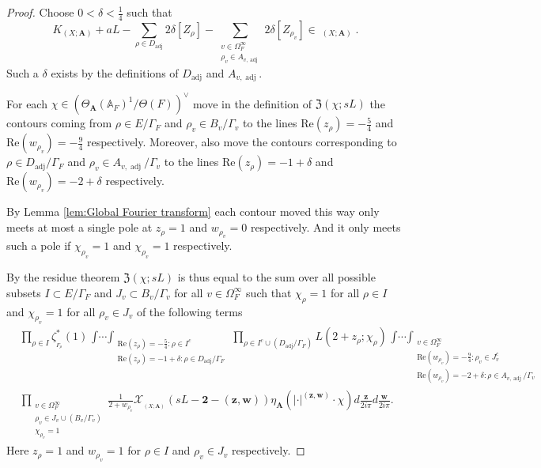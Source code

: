 \documentclass[a4paper,11pt,reqno]{amsart}
\newcommand{\A}{\mathbb{A}}
\DeclareMathOperator{\Eff}{\overline{Eff}}
\DeclareMathOperator{\adj}{adj}
\renewcommand{\Re}{\mathrm{Re}}
\theoremstyle{definition}
\begin{document}
\begin{proof}
	Choose $0 < \delta < \frac{1}{4}$ such that 
	\begin{equation}
		K_{(X; \mathbf{A})} + aL - \sum_{\rho \in D_{\adj}} 2\delta [Z_{\rho}] - \sum_{\substack{v \in \Omega_{F}^{\infty} \\ \rho_v \in A_{v, \adj}}} 2\delta [Z_{\rho_v}] \in \Eff_{(X; \mathbf{A})}. 
		\label{Choice of delta}
	\end{equation}
	Such a $\delta$ exists by the definitions of $D_{\adj}$ and $A_{v, \adj}$.
	
	For each $\chi \in (\Theta_{\mathbf{A}}(\A_F)^1/\Theta(F))^{\vee}$ move in the definition of $\mathfrak{Z}(\chi; sL)$ the contours coming from $\rho \in E / \Gamma_F$ and $\rho_v \in B_v / \Gamma_v$ to the lines $\Re(z_{\rho}) = -\frac{5}{4}$ and $\Re(w_{\rho_v}) = - \frac{9}{4}$ respectively. Moreover, also move the contours corresponding to $\rho \in D_{\adj} / \Gamma_F$ and $\rho_v \in A_{v, \adj} / \Gamma_v$ to the lines $\Re(z_{\rho}) = -1 + \delta$ and $\Re(w_{\rho_v}) = - 2 + \delta$ respectively.
	
	By Lemma \ref{lem:Global Fourier transform} each contour moved this way only meets at most a single pole at $z_{\rho} = 1$ and $w_{\rho_v} = 0$ respectively. And it only meets such a pole if $\chi_{\rho_v} = 1$ and $\chi_{\rho_v} = 1$ respectively.
	
	By the residue theorem $\mathfrak{Z}(\chi ; s L)$ is thus equal to the sum over all possible subsets $I \subset E/\Gamma_F$ and $J_v \subset B_v / \Gamma_v$ for all $v \in \Omega_{F}^{\infty}$ such that $\chi_{\rho} = 1$ for all $\rho \in I$ and $\chi_{\rho_v} = 1$ for all $\rho_v \in J_v$ of the following terms
	\begin{equation}\label{eq:Terms after moving the contours}
	\begin{split}
		&\prod_{\rho \in I} \zeta^*_{_{F_{\rho}}}(1) \mathop{\int \cdots \int}_{\substack{ \Re(z_{\rho}) = -\frac{5}{4}: \rho \in I^c \\ \Re(z_{\rho}) = - 1 + \delta: \rho \in D_{\adj}/ \Gamma_{F}}} \prod_{\rho \in I^c \cup (D_{\adj}/ \Gamma_{F})} L(2 + z_{\rho} ; \chi_{\rho}) 
		\mathop{\int \cdots \int}_{\substack{v \in \Omega_{F}^{\infty} \\ 
		\Re(w_{\rho_v}) = -\frac{9}{4}: \rho_v \in J_v^c \\ \Re(w_{\rho_v}) = - 2 + \delta: \rho \in A_{v, \adj} / \Gamma_v}} \\
		&\prod_{\substack{v \in \Omega_{F}^{\infty} \\ \rho_v \in J_v \cup (B_v/ \Gamma_v) \\ \chi_{\rho_v} = 1}} \frac{1}{2 + w_{\rho_v}} 
		\mathcal{X}_{\Eff_{(X; \mathbf{A})}}(s L - \mathbf{2} - (\bm{z}, \bm{w})) \eta_{\mathbf{A}}(|\cdot|^{(\bm{z}, \bm{w})} \cdot \chi)
		d\frac{\bm{z}}{2 i \pi} d \frac{\bm{w}}{2 i \pi}.
	\end{split}
	\end{equation}
	Here $z_{\rho} = 1 $ and $w_{\rho_v} = 1$ for $\rho \in I$ and $\rho_v \in J_v$ respectively.
	

\end{proof}
\end{document}
